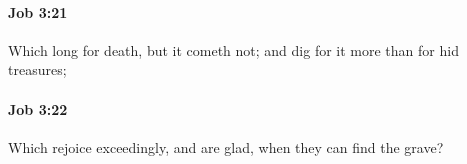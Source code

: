 		\paragraph{Job 3:21} %
			\label{JOB-3-21}

			Which long for death, but it cometh not; and dig for it more than for hid treasures;


		\paragraph{Job 3:22} %
			\label{JOB-3-22}

			Which rejoice exceedingly, and are glad, when they can find the grave?


